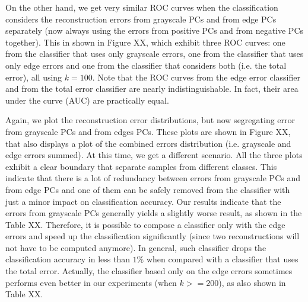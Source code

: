 \documentclass[10pt, conference, compsocconf]{IEEEtran}
\begin{document}

On the other hand, we get very similar ROC curves when the classification considers the reconstruction errors from grayscale PCs and from edge PCs separately (now always using the errors from positive PCs and from negative PCs together). This in shown in Figure XX, which exhibit three ROC curves: one from the classifier that uses only grayscale errors, one from the classifier that uses only edge errors and one from the classifier that considers both (i.e. the total error), all using $k = 100$. Note that the ROC curves from the edge error classifier and from the total error classifier are nearly indistinguishable. In fact, their area under the curve (AUC) are practically equal.


Again, we plot the reconstruction error distributions, but now segregating error from grayscale PCs and from edges PCs. These plots are shown in Figure XX, that also displays a plot of the combined errors distribution (i.e. grayscale and edge errors summed). At this time, we get a different scenario. All the three plots exhibit a clear boundary that separate samples from different classes. This indicate that there is a lot of redundancy between errors from grayscale PCs and from edge PCs and one of them can be safely removed from the classifier with just a minor impact on classification accuracy. Our results indicate that the errors from grayscale PCs generally yields a slightly worse result, as shown in the Table XX. Therefore, it is possible to compose a classifier only with the edge errors and speed up the classification significantly (since two reconstructions will not have to be computed anymore). In general, such classifier drops the classification accuracy in less than $1\%$ when compared with a classifier that uses the total error. Actually, the classifier based only on the edge errors sometimes performs even better in our experiments (when $k >= 200$), as also shown in Table XX.


\end{document}
